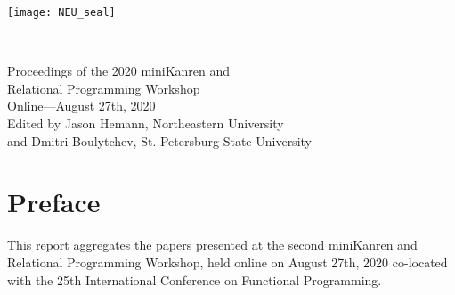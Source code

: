 \documentclass[oneside]{book}
\date{January 6th, 2021}
\author{Jason Hemann \and Dmitri Boulytchev}
\begin{document}
\frontmatter
\begin{titlepage}
\thispagestyle{empty}
\hspace{-15pt}%
\colorbox{neured}{%
\begin{minipage}[t][130pt][t]{0.99\textwidth}%
\hspace{30pt}%
\begin{minipage}[t][130pt][t]{0.16\textwidth}%
\vspace{\fill}%
\texttt{[image: NEU\_seal]}%
\vspace{\fill}%
\end{minipage}%
\begin{minipage}[t][130pt][t]{0.70\textwidth}%
\vspace{\fill}%
\\
%
\vspace{30pt}%
\end{minipage}%
\end{minipage}}
\vspace{30pt}
\begin{flushright}
\Huge{Proceedings of the 2020 miniKanren and\\ Relational Programming Workshop}\\
\vspace{20pt}
\large{Online---August 27th, 2020}\\
\vspace{20pt}
\large{Edited by Jason Hemann, Northeastern University\\ and Dmitri Boulytchev, St. Petersburg State University}
\end{flushright}
\vspace{\fill}
\colorbox{neugrey}{%
\begin{minipage}[t][24pt][t]{0.99\textwidth}
\hspace{30pt}
\end{minipage}}
\end{titlepage}
\restoregeometry
{}
\chapter*{Preface}
This report aggregates the papers presented at the second miniKanren
and Relational Programming Workshop, held online on August 27th, 2020
co-located with the 25th International Conference on
Functional Programming.
\end{document}

